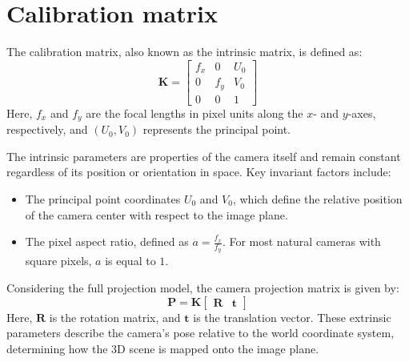 \section{Calibration matrix}

The calibration matrix, also known as the intrinsic matrix, is defined as:
\[\mathbf{K}=\begin{bmatrix} f_x & 0 & U_0 \\ 0 & f_y & V_0 \\ 0 & 0 & 1 \end{bmatrix}\]
Here, $f_x$ and $f_y$ are the focal lengths in pixel units along the $x$- and $y$-axes, respectively, and $(U_0,V_0)$ represents the principal point. 

The intrinsic parameters are properties of the camera itself and remain constant regardless of its position or orientation in space. 
Key invariant factors include:
\begin{itemize}
    \item The principal point coordinates $U_0$ and $V_0$, which define the relative position of the camera center with respect to the image plane.
    \item The pixel aspect ratio, defined as $a=\frac{f_x}{f_y}$. 
    For most natural cameras with square pixels, $a$ is equal to $1$.
\end{itemize}
\noindent Considering the full projection model, the camera projection matrix is given by:
\[\mathbf{P}=\mathbf{K}\begin{bmatrix}\mathbf{R} & \mathbf{t}\end{bmatrix}\]
Here, $\mathbf{R}$ is the rotation matrix, and $\mathbf{t}$ is the translation vector.
These extrinsic parameters describe the camera’s pose relative to the world coordinate system, determining how the 3D scene is mapped onto the image plane.